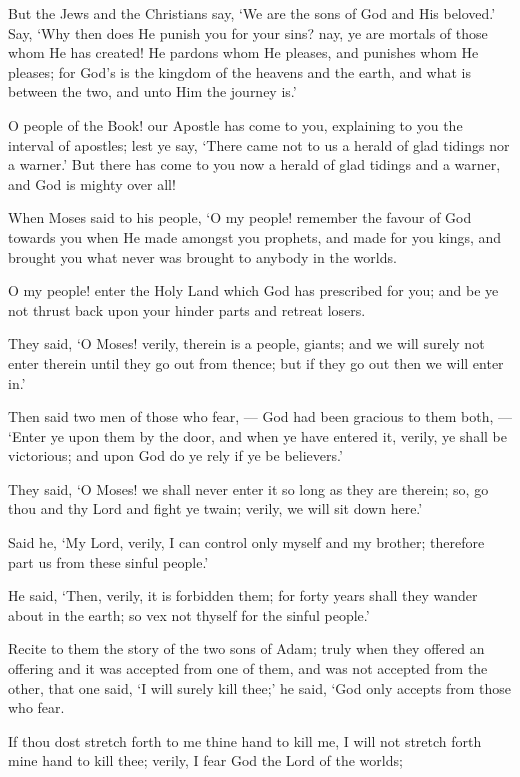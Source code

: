 \documentclass[fontsize=14pt, letterpaper, notitlepage, openany, DIV=12]{scrbook} %
\begin{document}
\noindent[5:18]
But the Jews and the Christians say, `We are the sons of God and His beloved.' Say,
`Why then does He punish you for your sins? nay, ye are mortals of those whom He has created!
He pardons whom He pleases, and punishes whom He pleases; for God's is the kingdom of the
heavens and the earth, and what is between the two, and unto Him the journey is.'

\noindent[5:19]
O people of the Book! our Apostle has come to you, explaining to you the interval of
apostles; lest ye say, `There came not to us a herald of glad tidings nor a warner.' But there has
come to you now a herald of glad tidings and a warner, and God is mighty over all!

\noindent[5:20]
When Moses said to his people, `O my people! remember the favour of God towards you
when He made amongst you prophets, and made for you kings, and brought you what never was
brought to anybody in the worlds.

\noindent[5:21]
O my people! enter the Holy Land which God has prescribed for you; and be ye not
thrust back upon your hinder parts and retreat losers.

\noindent[5:22]
They said, `O Moses! verily, therein is a people, giants; and we will surely not enter
therein until they go out from thence; but if they go out then we will enter in.'

\noindent[5:23]
Then said two men of those who fear, --- God had been gracious to them both, --- `Enter
ye upon them by the door, and when ye have entered it, verily, ye shall be victorious; and upon
God do ye rely if ye be believers.'

\noindent[5:24]
They said, `O Moses! we shall never enter it so long as they are therein; so, go thou and
thy Lord and fight ye twain; verily, we will sit down here.'

\noindent[5:25]
Said he, `My Lord, verily, I can control only myself and my brother; therefore part us
from these sinful people.'

\noindent[5:26]
He said, `Then, verily, it is forbidden them; for forty years shall they wander about in the
earth; so vex not thyself for the sinful people.'

\noindent[5:27]
Recite to them the story of the two sons of Adam; truly when they offered an offering and
it was accepted from one of them, and was not accepted from the other, that one said, `I will
surely kill thee;' he said, `God only accepts from those who fear.

\noindent[5:28]
If thou dost stretch forth to me thine hand to kill me, I will not stretch forth mine hand to
kill thee; verily, I fear God the Lord of the worlds;
\end{document}
